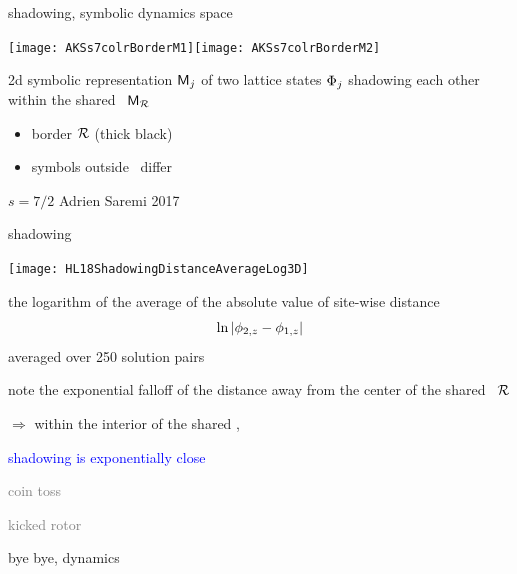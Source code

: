 \begin{frame}{shadowing, symbolic dynamics space}
\begin{center}
\texttt{[image: AKSs7colrBorderM1]}\hspace{0.7cm}\texttt{[image: AKSs7colrBorderM2]}
\end{center}
2d symbolic representation $\mathsf{M}_j$ of two lattice states $\Phi_j$
shadowing each other within the shared
\brick\ $\mathsf{M}_{\mathcal{R}}$ %

\begin{itemize}
  \item border $\mathcal{R}$ (thick black) %
  \item symbols outside \R\ differ
\end{itemize}
\vfill
$s=7/2$    \hfill                          Adrien Saremi 2017
\end{frame}

\begin{frame}{shadowing} %
\begin{center}
\texttt{[image: HL18ShadowingDistanceAverageLog3D]}
\end{center}

\bigskip

the logarithm of the average of the absolute value of site-wise distance
\[
\ln|\phi_{2,z}-\phi_{1,z}|
\]
averaged over 250 solution pairs
\medskip

note the exponential falloff of the distance away from the center of the
shared \brick\ $\mathcal{R}$ %
\medskip

$\Rightarrow$ within the interior of the shared \brick,

\hfill \textcolor{blue}{shadowing is exponentially close}
\end{frame}

\begin{frame}{}
\begin{enumerate}
              \item \textcolor{gray}{\small
coin toss
              \item
kicked rotor
              \item
\catlatt
                  }
              \item {\Large
bye bye, dynamics
                    }
            \end{enumerate}
\end{frame}


